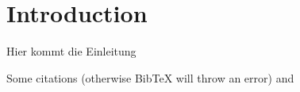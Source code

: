 \chapter{Introduction}
\label{sec:introduction}

Hier kommt die Einleitung

Some citations (otherwise BibTeX will throw an error)
\cite{Doniec} and \cite{Seber}